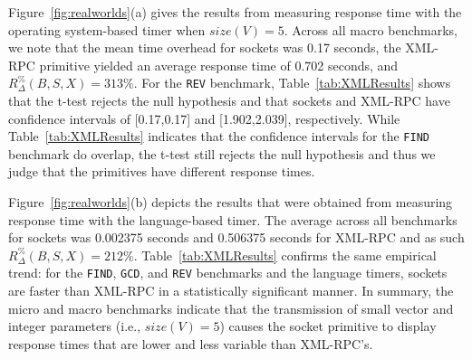 \documentclass{sig-alternate}
\begin{document}

Figure~\ref{fig:realworlds}(a) gives the results from measuring
response time with the operating system-based timer when $size(V) =
5$.  Across all macro benchmarks, we note that the mean time overhead
for sockets was 0.17 seconds, the XML-RPC primitive yielded an average
response time of 0.702 seconds, and {\small
  $R_\Delta^\%(B,S,X)$}$=313\%$.  For the \texttt{REV} benchmark,
Table~\ref{tab:XMLResults} shows that the t-test rejects the null
hypothesis and that sockets and XML-RPC have confidence intervals of
[0.17,0.17] and [1.902,2.039], respectively.  While
Table~\ref{tab:XMLResults} indicates that the confidence intervals for
the {\tt FIND} benchmark do overlap, the t-test still rejects the null
hypothesis and thus we judge that the primitives have different
response times.




Figure~\ref{fig:realworlds}(b) depicts the results that were obtained
from measuring response time with the language-based timer. The
average across all benchmarks for sockets was 0.002375 seconds and
0.506375 seconds for XML-RPC and as such {\small
  $R_\Delta^\%(B,S,X)$}$=212\%$.  Table~\ref{tab:XMLResults} confirms
the same empirical trend: for the {\tt FIND}, {\tt GCD}, and {\tt REV}
benchmarks and the language timers, sockets are faster than XML-RPC in
a statistically significant manner.  In summary, the micro and macro
benchmarks indicate that the transmission of small vector and integer
parameters (i.e., $size(V)=5$) causes the socket primitive to display
response times that are lower and less variable than XML-RPC's.
\end{document}
